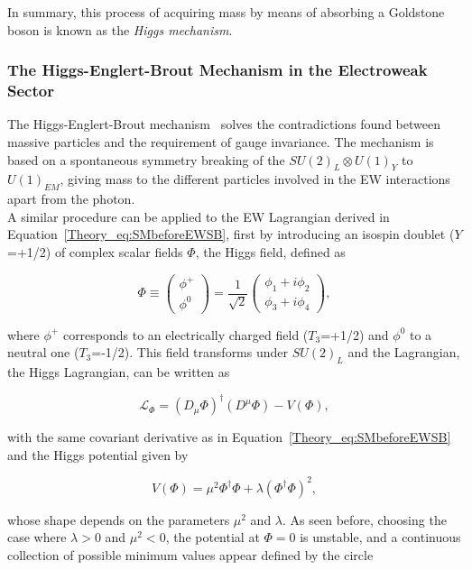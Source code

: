 In summary, this process of acquiring mass by means of absorbing a Goldstone boson is known as the \textit{Higgs mechanism}.

\subsubsection{The Higgs-Englert-Brout Mechanism in the Electroweak Sector}

The Higgs-Englert-Brout mechanism~\cite{Higgs1,Higgs2,Englert} solves the contradictions found between massive particles and
the requirement of gauge invariance. The mechanism is based on a spontaneous symmetry breaking of the $SU(2)_L\otimes U(1)_Y$ to $U(1)_{EM}$,
giving mass to the different particles involved in the \acrshort{EW} interactions apart from the photon.\\

A similar procedure can be applied to the EW Lagrangian derived in Equation~\ref{Theory_eq:SMbeforeEWSB},
first by introducing an isospin doublet ($Y$=+1/2) of complex scalar fields $\Phi$, the Higgs field, defined as

\begin{equation}
    \Phi\equiv
    \begin{pmatrix} \phi^+ \\ \phi^0 \end{pmatrix}
    =\frac{1}{\sqrt{2}}
    \begin{pmatrix} \phi_1 + i\phi_2 \\ \phi_3 + i\phi_4 \end{pmatrix},
\end{equation}

where $\phi^+$ corresponds to an electrically charged field ($T_3$=+1/2) and $\phi^0$ to a neutral one ($T_3$=-1/2).
This field transforms under $SU(2)_L$ and the Lagrangian, the Higgs Lagrangian, can be written as

\begin{equation}
    \mathcal{L}_\Phi = (D_\mu\Phi)^\dag(D^\mu\Phi)-V(\Phi),
\end{equation}

with the same covariant derivative as in Equation~\ref{Theory_eq:SMbeforeEWSB} and the Higgs potential given by

\begin{equation}
    V(\Phi) = \mu^2\Phi^\dag\Phi+\lambda(\Phi^\dag\Phi)^2,
\end{equation}

whose shape depends on the parameters $\mu^2$ and $\lambda$. As seen before, choosing the case where $\lambda>0$ and $\mu^2<0$,
the potential at $\Phi=0$ is unstable, and a continuous collection of possible minimum values appear defined by the circle

